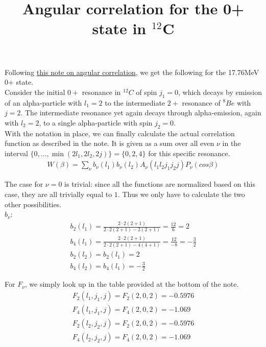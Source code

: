 \documentclass[onecolumn, a4paper, oneside, article, 12pt]{article}
\title{Angular correlation for the 0+ state in $^{12}$C}
\begin{document}
\maketitle

Following \href{https://wiki.kern.phys.au.dk/note_angular-correlations.pdf}{this note on angular correlation}, we get the following for the 17.76MeV 0+ state. \\

Consider the initial $0+$ resonance in $^{12}C$ of spin $j_1 = 0$, which decays by emission of an alpha-particle with $l_1 = 2$ to the intermediate $2+$ resonance of $^8Be$ with $j = 2$. The intermediate resonance yet again decays through alpha-emission, again with $l_2 = 2$, to a single alpha-particle with spin $j_2 = 0$. \\

With the notation in place, we can finally calculate the actual correlation function as described in the note. It is given as a sum over all even $\nu$ in the interval $\{0, ..., \min(2l_1, 2l_2, 2j)\} = \{0, 2, 4\}$ for this specific resonance. 
\begin{align*}
	W(\beta) = \sum_\nu b_\nu(l_1) b_\nu(l_2) A_\nu(l_1 l_2 j_1 j_2 j) P_\nu(cos\beta)
\end{align*}

The case for $\nu = 0$ is trivial: since all the functions are normalized based on this case, they are all trivially equal to $1$. Thus we only have to calculate the two other possibilities. \\

$b_\nu$:
\begin{gather*}
	b_2(l_1) = \frac{2 \cdot 2(2+1)}{2 \cdot 2(2+1) - 2(2+1)} = \frac{12}{6} = 2 \\
	b_4(l_1) = \frac{2 \cdot 2(2+1)}{2 \cdot 2(2+1) - 4(4+1)} = \frac{12}{-8} = -\frac{3}{2} \\
	b_2(l_2) = b_2(l_1) = 2 \\
	b_4(l_2) = b_4(l_1) = -\frac{3}{2}
\end{gather*}

For $F_\nu$, we simply look up in the table provided at the bottom of the note. 
\begin{gather*}
	F_2(l_1, j_1, j) = F_2(2, 0, 2) = -0.5976 \\
	F_4(l_1, j_1, j) = F_4(2, 0, 2) = -1.069 \\
	F_2(l_2, j_2, j) = F_2(2, 0, 2) = -0.5976 \\
	F_4(l_2, j_2, j) = F_4(2, 0, 2) = -1.069
\end{gather*} 
\end{document}
